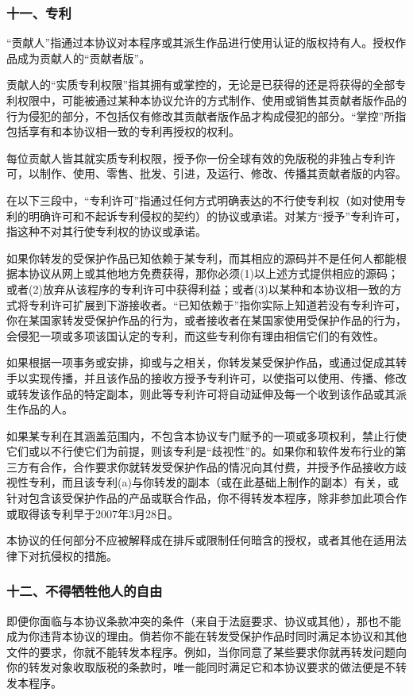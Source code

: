 \subsubsection{十一、专利}
“贡献人”指通过本协议对本程序或其派生作品进行使用认证的版权持有人。授权作品成为贡献人的“贡献者版”。\par
贡献人的“实质专利权限”指其拥有或掌控的，无论是已获得的还是将获得的全部专利权限中，可能被通过某种本协议允许的方式制作、使用或销售其贡献者版作品的行为侵犯的部分，不包括仅有修改其贡献者版作品才构成侵犯的部分。“掌控”所指包括享有和本协议相一致的专利再授权的权利。\par
每位贡献人皆其就实质专利权限，授予你一份全球有效的免版税的非独占专利许可，以制作、使用、零售、批发、引进，及运行、修改、传播其贡献者版的内容。\par
在以下三段中，“专利许可”指通过任何方式明确表达的不行使专利权（如对使用专利的明确许可和不起诉专利侵权的契约）的协议或承诺。对某方“授予”专利许可，指这种不对其行使专利权的协议或承诺。\par
如果你转发的受保护作品已知依赖于某专利，而其相应的源码并不是任何人都能根据本协议从网上或其他地方免费获得，那你必须(1)以上述方式提供相应的源码；或者(2)放弃从该程序的专利许可中获得利益；或者(3)以某种和本协议相一致的方式将专利许可扩展到下游接收者。“已知依赖于”指你实际上知道若没有专利许可，你在某国家转发受保护作品的行为，或者接收者在某国家使用受保护作品的行为，会侵犯一项或多项该国认定的专利，而这些专利你有理由相信它们的有效性。\par
如果根据一项事务或安排，抑或与之相关，你转发某受保护作品，或通过促成其转手以实现传播，并且该作品的接收方授予专利许可，以使指可以使用、传播、修改或转发该作品的特定副本，则此等专利许可将自动延伸及每一个收到该作品或其派生作品的人。\par
如果某专利在其涵盖范围内，不包含本协议专门赋予的一项或多项权利，禁止行使它们或以不行使它们为前提，则该专利是“歧视性”的。如果你和软件发布行业的第三方有合作，合作要求你就转发受保护作品的情况向其付费，并授予作品接收方歧视性专利，而且该专利(a)与你转发的副本（或在此基础上制作的副本）有关，或针对包含该受保护作品的产品或联合作品，你不得转发本程序，除非参加此项合作或取得该专利早于2007年3月28日。\par
本协议的任何部分不应被解释成在排斥或限制任何暗含的授权，或者其他在适用法律下对抗侵权的措施。
\subsubsection{十二、不得牺牲他人的自由}
即便你面临与本协议条款冲突的条件（来自于法庭要求、协议或其他），那也不能成为你违背本协议的理由。倘若你不能在转发受保护作品时同时满足本协议和其他文件的要求，你就不能转发本程序。例如，当你同意了某些要求你就再转发问题向你的转发对象收取版税的条款时，唯一能同时满足它和本协议要求的做法便是不转发本程序。

